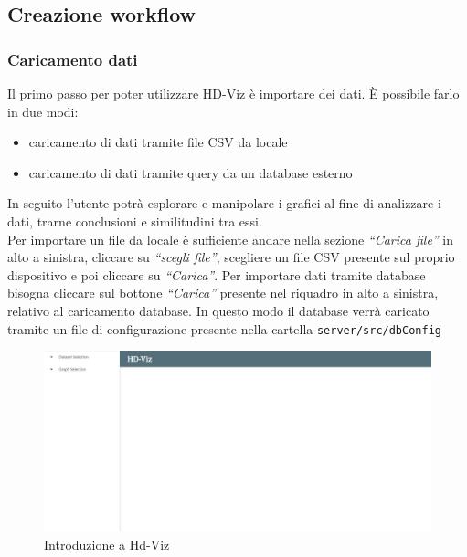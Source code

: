 \documentclass[../manuale_utente.tex]{subfiles}
\begin{document}
\subsection{Creazione workflow}
    \label{sub:crea_work}
\subsubsection{Caricamento dati}
    \label{subsub:carica_dati}

Il primo passo per poter utilizzare HD-Viz è importare dei dati. È possibile farlo in due modi:
\begin{itemize}
    \item caricamento di dati tramite file CSV da locale
    \item caricamento di dati tramite query da un database esterno
\end{itemize}
In seguito l’utente potrà esplorare e manipolare i grafici al fine di analizzare i dati, trarne conclusioni e similitudini tra essi. \\
Per importare un file da locale è sufficiente andare nella sezione \emph{“Carica file”}  in alto a sinistra, cliccare su \emph{“scegli file”}, scegliere un file CSV presente sul proprio dispositivo e poi cliccare su \emph{“Carica”}. 
Per importare dati tramite database bisogna cliccare sul bottone \emph{“Carica”} presente nel riquadro in alto a sinistra, relativo al caricamento database.
In questo modo il database verrà caricato tramite un file di configurazione presente nella cartella  \verb|server/src/dbConfig|

\begin{figure}[H]
	\centering
	\includegraphics[width=18cm]{img/introduzione.jpg}
	\caption{Introduzione a Hd-Viz}
\end{figure}
\end{document}
